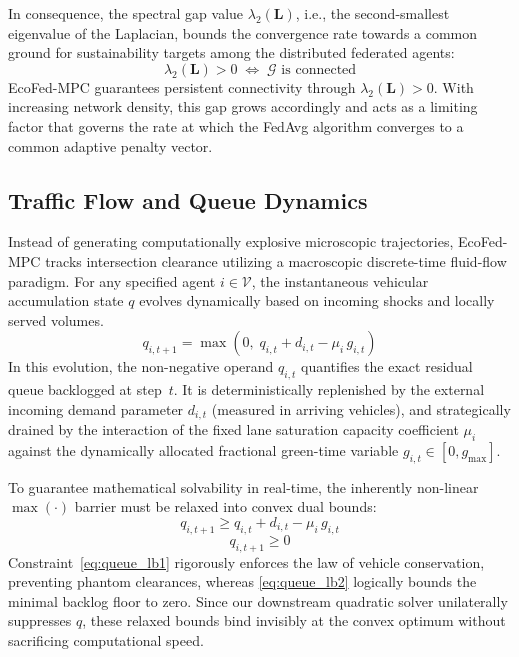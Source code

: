 \documentclass[journal]{IEEEtran}
\begin{document}
In consequence, the spectral gap value $\lambda_2(\mathbf{L})$, i.e., the second-smallest eigenvalue of the Laplacian, bounds the convergence rate towards a common ground for sustainability targets among the distributed federated agents:
\begin{equation}
    \lambda_2(\mathbf{L}) > 0 \;\Longleftrightarrow\; \mathcal{G}\text{ is connected}
    \label{eq:spectral}
\end{equation}
EcoFed-MPC guarantees persistent connectivity through $\lambda_2(\mathbf{L}) > 0$. With increasing network density, this gap grows accordingly and acts as a limiting factor that governs the rate at which the FedAvg algorithm converges to a common adaptive penalty vector.

\subsection{Traffic Flow and Queue Dynamics}
Instead of generating computationally explosive microscopic trajectories, EcoFed-MPC tracks intersection clearance utilizing a macroscopic discrete-time fluid-flow paradigm. For any specified agent $i \in \mathcal{V}$, the instantaneous vehicular accumulation state $q$ evolves dynamically based on incoming shocks and locally served volumes.
\begin{equation}
    q_{i,t+1} = \max\!\left(0,\; q_{i,t} + d_{i,t} - \mu_i\, g_{i,t}\right)
    \label{eq:queue_exact}
\end{equation}
In this evolution, the non-negative operand $q_{i,t}$ quantifies the exact residual queue backlogged at step~$t$. It is deterministically replenished by the external incoming demand parameter $d_{i,t}$ (measured in arriving vehicles), and strategically drained by the interaction of the fixed lane saturation capacity coefficient $\mu_i$ against the dynamically allocated fractional green-time variable $g_{i,t} \in [0, g_{\max}]$.

To guarantee mathematical solvability in real-time, the inherently non-linear $\max(\cdot)$ barrier must be relaxed into convex dual bounds:
\begin{equation}
    q_{i,t+1} \geq q_{i,t} + d_{i,t} - \mu_i\, g_{i,t}
    \label{eq:queue_lb1}
\end{equation}
\begin{equation}
    q_{i,t+1} \geq 0
    \label{eq:queue_lb2}
\end{equation}
Constraint~\eqref{eq:queue_lb1} rigorously enforces the law of vehicle conservation, preventing phantom clearances, whereas \eqref{eq:queue_lb2} logically bounds the minimal backlog floor to zero. Since our downstream quadratic solver unilaterally suppresses $q$, these relaxed bounds bind invisibly at the convex optimum without sacrificing computational speed.
\end{document}
